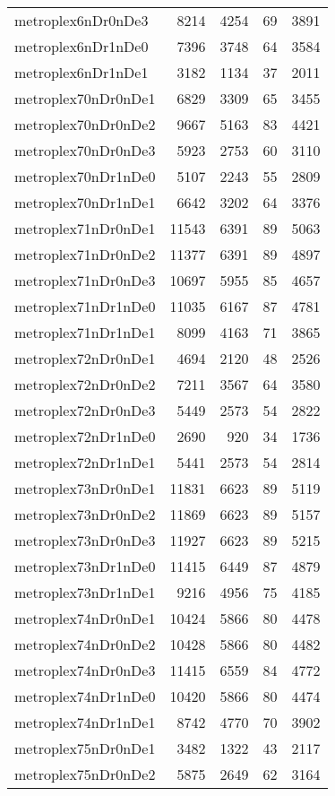 \documentclass[../../../thesis.tex]{subfiles}
\begin{document}
\begin{longtable}{lrrrr}
metroplex6nDr0nDe3 & 8214 & 4254 & 69 & 3891 \\
metroplex6nDr1nDe0 & 7396 & 3748 & 64 & 3584 \\
metroplex6nDr1nDe1 & 3182 & 1134 & 37 & 2011 \\
metroplex70nDr0nDe1 & 6829 & 3309 & 65 & 3455 \\
metroplex70nDr0nDe2 & 9667 & 5163 & 83 & 4421 \\
metroplex70nDr0nDe3 & 5923 & 2753 & 60 & 3110 \\
metroplex70nDr1nDe0 & 5107 & 2243 & 55 & 2809 \\
metroplex70nDr1nDe1 & 6642 & 3202 & 64 & 3376 \\
metroplex71nDr0nDe1 & 11543 & 6391 & 89 & 5063 \\
metroplex71nDr0nDe2 & 11377 & 6391 & 89 & 4897 \\
metroplex71nDr0nDe3 & 10697 & 5955 & 85 & 4657 \\
metroplex71nDr1nDe0 & 11035 & 6167 & 87 & 4781 \\
metroplex71nDr1nDe1 & 8099 & 4163 & 71 & 3865 \\
metroplex72nDr0nDe1 & 4694 & 2120 & 48 & 2526 \\
metroplex72nDr0nDe2 & 7211 & 3567 & 64 & 3580 \\
metroplex72nDr0nDe3 & 5449 & 2573 & 54 & 2822 \\
metroplex72nDr1nDe0 & 2690 & 920 & 34 & 1736 \\
metroplex72nDr1nDe1 & 5441 & 2573 & 54 & 2814 \\
metroplex73nDr0nDe1 & 11831 & 6623 & 89 & 5119 \\
metroplex73nDr0nDe2 & 11869 & 6623 & 89 & 5157 \\
metroplex73nDr0nDe3 & 11927 & 6623 & 89 & 5215 \\
metroplex73nDr1nDe0 & 11415 & 6449 & 87 & 4879 \\
metroplex73nDr1nDe1 & 9216 & 4956 & 75 & 4185 \\
metroplex74nDr0nDe1 & 10424 & 5866 & 80 & 4478 \\
metroplex74nDr0nDe2 & 10428 & 5866 & 80 & 4482 \\
metroplex74nDr0nDe3 & 11415 & 6559 & 84 & 4772 \\
metroplex74nDr1nDe0 & 10420 & 5866 & 80 & 4474 \\
metroplex74nDr1nDe1 & 8742 & 4770 & 70 & 3902 \\
metroplex75nDr0nDe1 & 3482 & 1322 & 43 & 2117 \\
metroplex75nDr0nDe2 & 5875 & 2649 & 62 & 3164 \\

\end{longtable}
\end{document}

